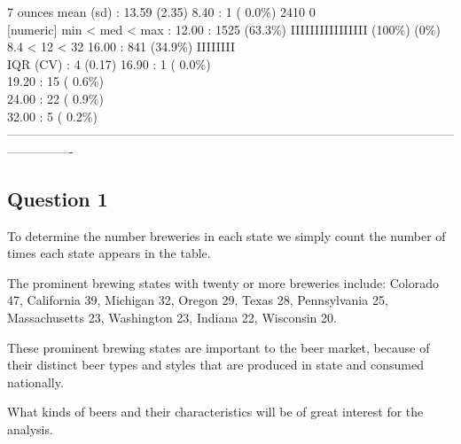 \documentclass[]{article}
\begin{document}
7 ounces mean (sd) : 13.59 (2.35) 8.40 : 1 ( 0.0\%) 2410 0\\
{[}numeric{]} min \textless{} med \textless{} max : 12.00 : 1525
(63.3\%) IIIIIIIIIIIIIIII (100\%) (0\%)\\
8.4 \textless{} 12 \textless{} 32 16.00 : 841 (34.9\%) IIIIIIII\\
IQR (CV) : 4 (0.17) 16.90 : 1 ( 0.0\%)\\
19.20 : 15 ( 0.6\%)\\
24.00 : 22 ( 0.9\%)\\
32.00 : 5 ( 0.2\%)\\
----------------------------------------------------------------------------------------------------------------------------

\subsection{Question 1}\label{question-1}

To determine the number breweries in each state we simply count the
number of times each state appears in the table.

The prominent brewing states with twenty or more breweries include:
Colorado 47, California 39, Michigan 32, Oregon 29, Texas 28,
Pennsylvania 25, Massachusetts 23, Washington 23, Indiana 22, Wisconsin
20.

These prominent brewing states are important to the beer market, because
of their distinct beer types and styles that are produced in state and
consumed nationally.

What kinds of beers and their characteristics will be of great interest
for the analysis.
\end{document}
